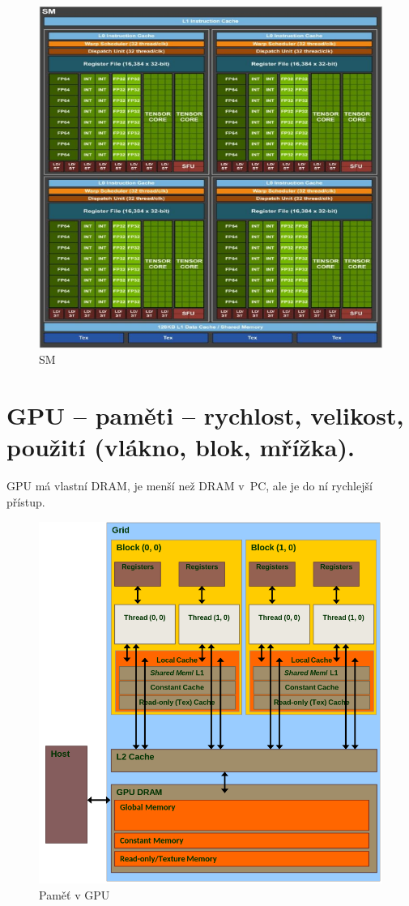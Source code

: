 \begin{figure}[ht]
    \centering
    \includegraphics[width=0.7\linewidth]{pict/SM.png}
    \caption{SM}
    \label{fig:SM}
\end{figure}

\section{GPU – paměti – rychlost, velikost, použití (vlákno, blok, mřížka).}
GPU má vlastní DRAM, je menší než DRAM v~PC, ale je do ní rychlejší přístup.

\begin{figure}
    \centering
    \includegraphics[width=0.6\linewidth]{pict/mem.png}
    \caption{Paměť v GPU}
    \label{fig:enter-label}
\end{figure}
